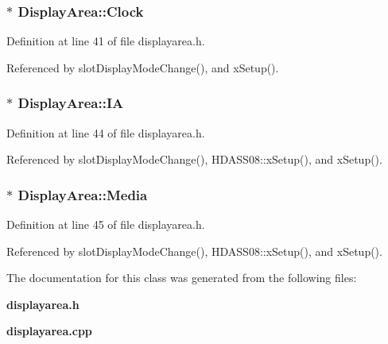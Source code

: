\subsubsection{$\ast$ {\bf Display\-Area::Clock}}\label{classDisplayArea_DisplayAreao0}




Definition at line 41 of file displayarea.h.

Referenced by slot\-Display\-Mode\-Change(), and x\-Setup().
\subsubsection{$\ast$ {\bf Display\-Area::IA}}\label{classDisplayArea_DisplayAreao3}




Definition at line 44 of file displayarea.h.

Referenced by slot\-Display\-Mode\-Change(), HDASS08::x\-Setup(), and x\-Setup().
\subsubsection{$\ast$ {\bf Display\-Area::Media}}\label{classDisplayArea_DisplayAreao4}




Definition at line 45 of file displayarea.h.

Referenced by slot\-Display\-Mode\-Change(), HDASS08::x\-Setup(), and x\-Setup().

The documentation for this class was generated from the following files:\begin{CompactItemize}
\item 
{\bf displayarea.h}\item 
{\bf displayarea.cpp}\end{CompactItemize}
